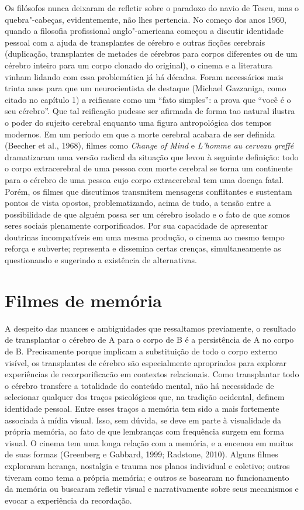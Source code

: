 Os filósofos nunca deixaram de refletir sobre o paradoxo do navio de
Teseu, mas o quebra"-cabeças, evidentemente, não lhes pertencia. No
começo dos anos 1960, quando a filosofia profissional anglo"-americana
começou a discutir identidade pessoal com a ajuda de transplantes de
cérebro e outras ficções cerebrais (duplicação, transplantes de metades
de cérebros para corpos diferentes ou de um cérebro inteiro para um
corpo clonado do original), o cinema e a literatura vinham lidando com
essa problemática já há décadas. Foram necessários mais trinta anos para
que um neurocientista de destaque (Michael Gazzaniga, como citado no
capítulo 1) a reificasse como um ``fato simples'': a prova que ``você é
o seu cérebro''. Que tal reificação pudesse ser afirmada de forma tao
natural ilustra o poder do sujeito cerebral enquanto uma figura
antropológica dos tempos modernos. Em um período em que a morte cerebral
acabara de ser definida (Beecher et al., 1968), filmes como \emph{Change
of Mind} e \emph{L'homme au cerveau greffé} dramatizaram uma versão
radical da situação que levou à seguinte definição: todo o corpo
extracerebral de uma pessoa com morte cerebral se torna um continente
para o cérebro de uma pessoa cujo corpo extracerebral tem uma doença
fatal. Porém, os filmes que discutimos transmitem mensagens conflitantes
e sustentam pontos de vista opostos, problematizando, acima de tudo, a
tensão entre a possibilidade de que alguém possa ser um cérebro isolado
e o fato de que somos seres sociais plenamente corporificados. Por sua
capacidade de apresentar doutrinas incompatíveis em uma mesma produção,
o cinema ao mesmo tempo reforça e subverte; representa e dissemina
certas crenças, simultaneamente as questionando e sugerindo a existência
de alternativas.

\chapter{Filmes de memória}

A despeito das nuances e ambiguidades que ressaltamos previamente, o
resultado de transplantar o cérebro de A para o corpo de B é a
persistência de A no corpo de B. Precisamente porque implicam a
substituição de todo o corpo externo visível, os transplantes de cérebro
são especialmente apropriados para explorar experiências de
recorporificacão em contextos relacionais. Como transplantar todo o
cérebro transfere a totalidade do conteúdo mental, não há necessidade de
selecionar qualquer dos traços psicológicos que, na tradição ocidental,
definem identidade pessoal. Entre esses traços a memória tem sido a mais
fortemente associada à mídia visual. Isso, sem dúvida, se deve em parte
à visualidade da própria memória, ao fato de que lembranças com
frequência surgem em forma visual. O cinema tem uma longa relação com a
memória, e a encenou em muitas de suas formas (Greenberg e Gabbard,
1999; Radstone, 2010). Alguns filmes exploraram herança, nostalgia e
trauma nos planos individual e coletivo; outros tiveram como tema a
própria memória; e outros se basearam no funcionamento da memória ou
buscaram refletir visual e narrativamente sobre seus mecanismos e evocar
a experiência da recordação.

